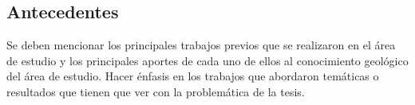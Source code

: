         \subsection{\large Antecedentes}
            Se deben mencionar los principales trabajos previos que se realizaron en el área de estudio y los principales aportes de cada uno de ellos al conocimiento geológico del área de estudio. Hacer énfasis en los trabajos que abordaron temáticas o resultados que tienen que ver con la problemática de la tesis.